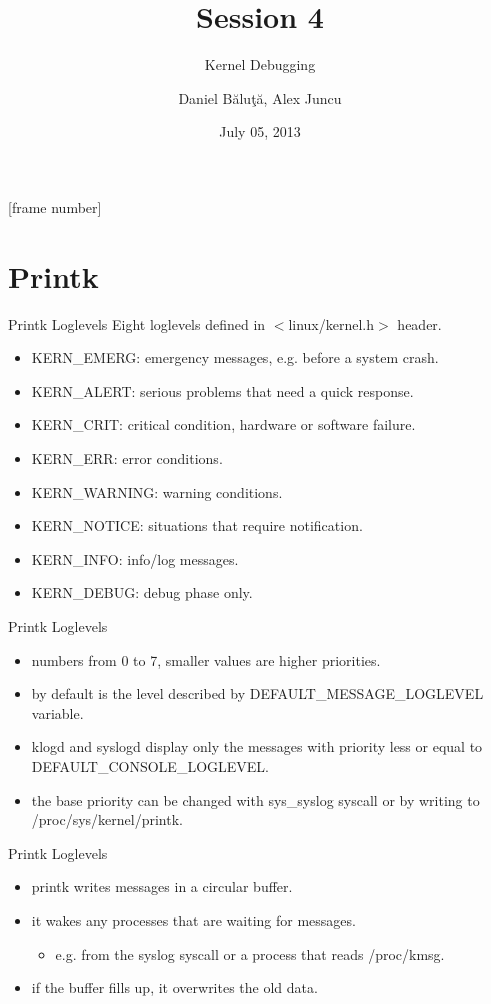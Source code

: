 \documentclass{workshop}
\title[Session 4]{Session 4}
\subtitle{Kernel Debugging}
\author{Daniel Băluţă, Alex Juncu}
\date{July 05, 2013}
\begin{document}
[frame number]

\frame{\titlepage}

\section{Printk}
\begin{frame}{Printk Loglevels}
Eight loglevels defined in $<$linux/kernel.h$>$ header.

\begin{itemize}
\item KERN\_EMERG: emergency messages, e.g. before a system crash.
\item KERN\_ALERT: serious problems that need a quick response.
\item KERN\_CRIT: critical condition, hardware or software failure.
\item KERN\_ERR: error conditions.
\item KERN\_WARNING: warning conditions.
\item KERN\_NOTICE: situations that require notification.
\item KERN\_INFO: info/log messages.
\item KERN\_DEBUG: debug phase only.
\end{itemize}
\end{frame}

\begin{frame}{Printk Loglevels}
\begin{itemize}
\item numbers from 0 to 7, smaller values are higher priorities.
\item by default is the level described by DEFAULT\_MESSAGE\_LOGLEVEL
variable.
\item klogd and syslogd display only the messages with priority less or equal
to DEFAULT\_CONSOLE\_LOGLEVEL.
\item the base priority can be changed with sys\_syslog syscall or by writing
to /proc/sys/kernel/printk.
\end{itemize}
\end{frame}

\begin{frame}{Printk Loglevels}
\begin{itemize}
\item printk writes messages in a circular buffer.
\item it wakes any processes that are waiting for messages.
\begin{itemize}
\item e.g. from the syslog syscall or a process that reads /proc/kmsg.
\end{itemize}
\item if the buffer fills up, it overwrites the old data.
\end{itemize}
\end{frame}
\end{document}
